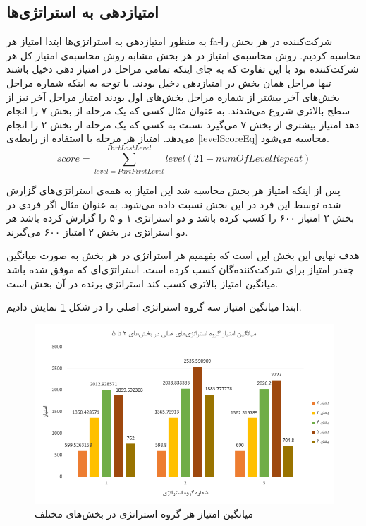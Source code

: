 \documentclass[twoside, a4paper,11pt]{book}
\numberwithin{equation}{chapter}
\numberwithin{table}{chapter}
\numberwithin{figure}{chapter}
\numberwithin{equation}{chapter}
\newcommand{\mls}[1]{\gls{fa-#1}\glsuseri{la-#1}}
\begin{document}
\subsection{امتیازدهی به استراتژی‌ها}
به منظور امتیازدهی به استراتژی‌ها ابتدا امتیاز هر  \mls{شرکت‌کننده} در هر بخش را محاسبه کردیم. روش محاسبه‌ی امتیاز در هر بخش مشابه روش محاسبه‌ی امتیاز کل هر شرکت‌کننده بود با این تفاوت که به جای اینکه تمامی مراحل در امتیاز دهی دخیل باشند تنها مراحل همان بخش در امتیازدهی دخیل بودند. با توجه به اینکه شماره مراحل بخش‌های آخر بیشتر از شماره مراحل بخش‌های اول بودند امتیاز مراحل آخر نیز از سطح بالاتری شروع می‌شدند. به عنوان مثال کسی که یک مرحله از بخش ۷ را انجام دهد امتیاز بیشتری از بخش ۷ می‌گیرد نسبت به کسی که یک مرحله از بخش ۲ را انجام می‌دهد. امتیاز هر مرحله با استفاده از رابطه‌ی \ref{levelScoreEq} محاسبه می‌شود.
\begin{equation}
\label{levelScoreEq}
	score = \sum_{level=PartFirstLevel}^{PartLastLevel} level(21-numOfLevelRepeat)
\end{equation}

پس از اینکه امتیاز هر بخش محاسبه شد این امتیاز به همه‌ی استراتژی‌های گزارش شده توسط این فرد در این بخش نسبت داده می‌شود. به عنوان مثال اگر فردی در بخش ۲ امتیاز ۶۰۰ را کسب کرده باشد و دو استراتژی ۱ و ۵ را گزارش کرده باشد هر دو استراتژی در بخش ۲ امتیاز ۶۰۰ می‌گیرند.

هدف نهایی این بخش این است که بفهمیم هر استراتژی در هر بخش به صورت میانگین چقدر امتیاز برای شرکت‌کننده‌گان کسب کرده است. استراتژی‌ای که موفق شده باشد میانگین امتیاز بالاتری کسب کند استراتژی برنده در آن بخش است.

ابتدا میانگین امتیاز سه گروه استراتژی اصلی را در شکل  \ref{fig:part2to5avgscores} نمایش دادیم.

\begin{figure}
\centering
\includegraphics[scale=0.8]{Figures/part2-5AvgScores.png}
\caption{\label{fig:part2to5avgscores}
میانگین امتیاز هر گروه استراتژی در بخش‌های مختلف
}
\end{figure}
\end{document}
